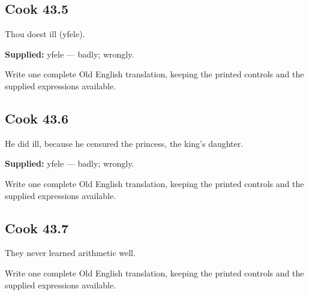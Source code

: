 \par\begin{minipage}{\linewidth}\raggedright
\subsection*{Cook 43.5}

Thou doest ill (yfele).

\end{minipage}\par\addvspace{4pt}

\textbf{Supplied:} yfele — badly; wrongly.

Write one complete Old English translation, keeping the printed controls and the supplied expressions available.

\par\begin{minipage}{\linewidth}\raggedright
\subsection*{Cook 43.6}

He did ill, because he censured the princess, the king’s daughter.

\textbf{Supplied:} yfele — badly; wrongly.

Write one complete Old English translation, keeping the printed controls and the supplied expressions available.

\end{minipage}\par\addvspace{4pt}

\par\begin{minipage}{\linewidth}\raggedright
\subsection*{Cook 43.7}

They never learned arithmetic well.

Write one complete Old English translation, keeping the printed controls and the supplied expressions available.

\end{minipage}\par\addvspace{4pt}

